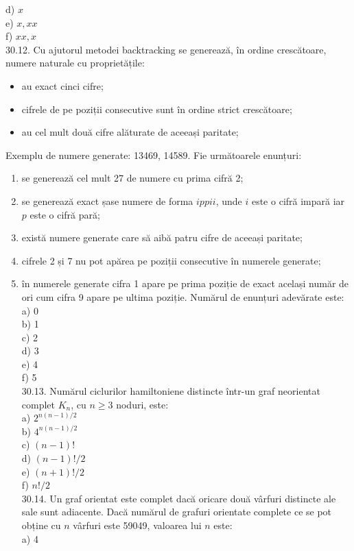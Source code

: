 \begin{itemize}
d) $x$
\\
e) $x, xx$
\\
f) $xx, x$
\\
30.12. Cu ajutorul metodei backtracking se generează, în ordine crescătoare, numere naturale cu proprietățile:
\begin{itemize}
  \item au exact cinci cifre;
  \item cifrele de pe poziții consecutive sunt în ordine strict crescătoare;
  \item au cel mult două cifre alăturate de aceeași paritate;
\end{itemize}
Exemplu de numere generate: 13469, 14589. Fie următoarele enunțuri:
\begin{enumerate}
  \item se generează cel mult 27 de numere cu prima cifră 2;
  \item se generează exact șase numere de forma $ippii$, unde $i$ este o cifră impară iar $p$ este o cifră pară;
  \item există numere generate care să aibă patru cifre de aceeași paritate;
  \item cifrele 2 și 7 nu pot apărea pe poziții consecutive în numerele generate;
  \item în numerele generate cifra 1 apare pe prima poziție de exact același număr de ori cum cifra 9 apare pe ultima poziție.
Numărul de enunțuri adevărate este:
\\
a) 0
\\
b) 1
\\
c) 2
\\
d) 3
\\
e) 4
\\
f) 5
\\
30.13. Numărul ciclurilor hamiltoniene distincte într-un graf neorientat complet $K_{n}$, cu $n \geq 3$ noduri, este:
\\
a) $2^{n(n-1)/2}$
\\
b) $4^{n(n-1)/2}$
\\
c) $(n-1)!$
\\
d) $(n-1)!/2$
\\
e) $(n+1)!/2$
\\
f) $n!/2$
\\
30.14. Un graf orientat este complet dacă oricare două vârfuri distincte ale sale sunt adiacente. Dacă numărul de grafuri orientate complete ce se pot obține cu $n$ vârfuri este 59049, valoarea lui $n$ este:
\\
a) 4
\\

\end{enumerate}
\end{itemize}
